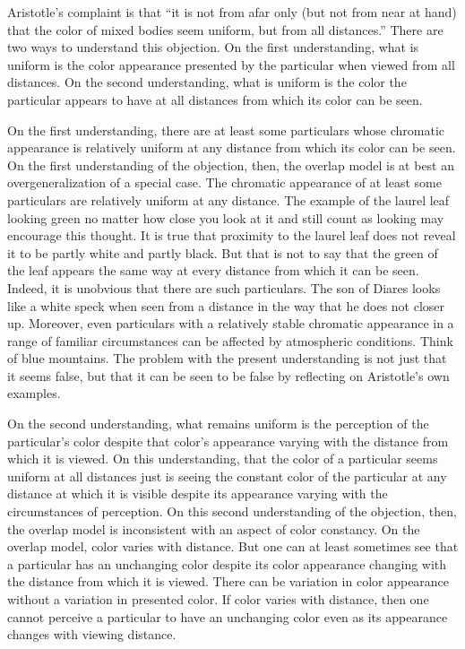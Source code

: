 Aristotle's complaint is that ``it is not from afar only (but not from near at hand) that the color of mixed bodies seem uniform, but from all distances.'' There are two ways to understand this objection. On the first understanding, what is uniform is the color appearance presented by the particular when viewed from all distances. On the second understanding, what is uniform is the color the particular appears to have at all distances from which its color can be seen.

On the first understanding, there are at least some particulars whose chromatic appearance is relatively uniform at any distance from which its color can be seen. On the first understanding of the objection, then, the overlap model is at best an overgeneralization of a special case. The chromatic appearance of at least some particulars are relatively uniform at any distance. The example of the laurel leaf looking green no matter how close you look at it and still count as looking may encourage this thought. It is true that proximity to the laurel leaf does not reveal it to be partly white and partly black. But that is not to say that the green of the leaf appears the same way at every distance from which it can be seen. Indeed, it is unobvious that there are such particulars. The son of Diares looks like a white speck when seen from a distance in the way that he does not closer up. Moreover, even particulars with a relatively stable chromatic appearance in a range of familiar circumstances can be affected by atmospheric conditions. Think of blue mountains. The problem with the present understanding is not just that it seems false, but that it can be seen to be false by reflecting on Aristotle's own examples. 

On the second understanding, what remains uniform is the perception of the particular's color despite that color's appearance varying with the distance from which it is viewed. On this understanding, that the color of a particular seems uniform at all distances just is seeing the constant color of the particular at any distance at which it is visible despite its appearance varying with the circumstances of perception. On this second understanding of the objection, then, the overlap model is inconsistent with an aspect of color constancy. On the overlap model, color varies with distance. But one can at least sometimes see that a particular has an unchanging color despite its color appearance changing with the distance from which it is viewed. There can be variation in color appearance without a variation in presented color. If color varies with distance, then one cannot perceive a particular to have an unchanging color even as its appearance changes with viewing distance.

